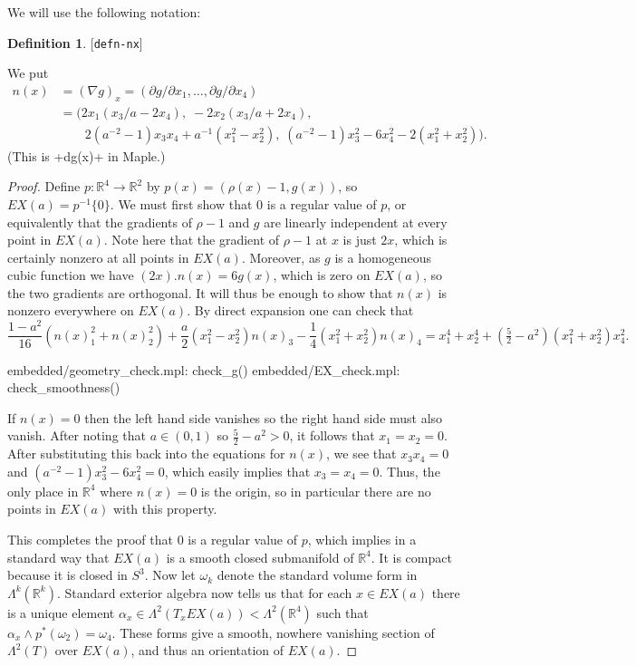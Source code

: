 \documentclass[reqno]{amsart}
\newcommand{\lbl}[1]{\label{#1}\textup{[\texttt{#1}]}\par}
\newcommand{\lbl}{\label}
\newcommand{\Lm}        {\Lambda}
\newcommand{\al}        {\alpha}
\newcommand{\om}        {\omega}
\newcommand{\R}         {{\mathbb{R}}}
\renewcommand{\:}{\colon}
\theoremstyle{definition}
\newtheorem{definition}[theorem]{Definition}
\begin{document}
We will use the following notation:
\begin{definition}\lbl{defn-nx}
 We put
 \begin{align*}
  n(x) &= (\nabla g)_x =
           (\partial g/\partial x_1,\dotsc,\partial g/\partial x_4) \\
   &= ( 2x_1(x_3/a-2x_4),\;
       -2x_2(x_3/a+2x_4), \\
   &\qquad
       2(a^{-2}-1)x_3x_4+a^{-1}(x_1^2-x_2^2),\;
       (a^{-2}-1)x_3^2-6x_4^2-2(x_1^2+x_2^2)).
 \end{align*}
 (This is \mcode+dg(x)+ in Maple.)
\end{definition}
\begin{proof}
 Define $p\:\R^4\to\R^2$ by $p(x)=(\rho(x)-1,g(x))$, so
 $EX(a)=p^{-1}\{0\}$.  We must first show that $0$ is a regular value
 of $p$, or equivalently that the gradients of $\rho-1$ and $g$ are
 linearly independent at every point in $EX(a)$.  Note here that the
 gradient of $\rho-1$ at $x$ is just $2x$, which is certainly nonzero
 at all points in $EX(a)$.  Moreover, as $g$ is a homogeneous cubic
 function we have $(2x).n(x)=6g(x)$, which is zero on $EX(a)$, so the
 two gradients are orthogonal.  It will thus be enough to show that
 $n(x)$ is nonzero everywhere on $EX(a)$.  By direct expansion one can
 check that
 \[ \frac{1-a^2}{16}(n(x)_1^2+n(x)_2^2) +
     \frac{a}{2}(x_1^2-x_2^2)n(x)_3 -
     \frac{1}{4}(x_1^2+x_2^2)n(x)_4 =
      x_1^4+x_2^4+(\tfrac{5}{2}-a^2)(x_1^2+x_2^2)x_4^2.
 \]
 \begin{checks}
  embedded/geometry_check.mpl: check_g()
  embedded/EX_check.mpl: check_smoothness()
 \end{checks}
 If $n(x)=0$ then the left hand side vanishes so the right hand side
 must also vanish.  After noting that $a\in (0,1)$ so
 $\frac{5}{2}-a^2>0$, it follows that $x_1=x_2=0$.  After substituting
 this back into the equations for $n(x)$, we see that $x_3x_4=0$ and
 $(a^{-2}-1)x_3^2-6x_4^2=0$, which easily implies that $x_3=x_4=0$.
 Thus, the only place in $\R^4$ where $n(x)=0$ is the origin, so in
 particular there are no points in $EX(a)$ with this property.

 This completes the proof that $0$ is a regular value of $p$, which
 implies in a standard way that $EX(a)$ is a smooth closed submanifold
 of $\R^4$.  It is compact because it is closed in $S^3$.  Now let
 $\om_k$ denote the standard volume form in $\Lm^k(\R^k)$.  Standard
 exterior algebra now tells us that for each $x\in EX(a)$ there is a
 unique element $\al_x\in\Lm^2(T_xEX(a))<\Lm^2(\R^4)$ such that
 $\al_x\wedge p^*(\om_2)=\om_4$.  These forms give a smooth, nowhere
 vanishing section of $\Lm^2(T)$ over $EX(a)$, and thus an orientation
 of $EX(a)$.
\end{proof}
\end{document}
